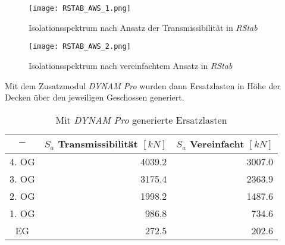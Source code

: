 \pagebreak

\begin{figure}[H]
    \centering
    \texttt{[image: RSTAB\_AWS\_1.png]}
    \caption{Isolationsspektrum nach Ansatz der Transmissibilität in \emph{RStab}}
\end{figure}

\begin{figure}[H]
    \centering
    \texttt{[image: RSTAB\_AWS\_2.png]}
    \caption{Isolationsspektrum nach vereinfachtem Ansatz in \emph{RStab}}
\end{figure}

Mit dem Zusatzmodul \emph{DYNAM Pro} wurden dann Ersatzlasten in Höhe der Decken über den jeweiligen Geschossen generiert.

\begin{table}[H]
\centering
\begin{tabular}{ |c|r|r| } 
 \hline
 $-$ & $S_a$ Transmissibilität $[kN]$ & $S_a$ Vereinfacht $[kN]$\\
 \hline\hline
4. OG & 4039.2 & 3007.0\\
3. OG & 3175.4 & 2363.9\\
2. OG & 1998.2 & 1487.6\\
1. OG &  986.8 &  734.6\\
EG    &  272.5 &  202.6\\
 \hline
\end{tabular}
\caption{Mit \emph{DYNAM Pro} generierte Ersatzlasten}
\end{table}

\pagebreak